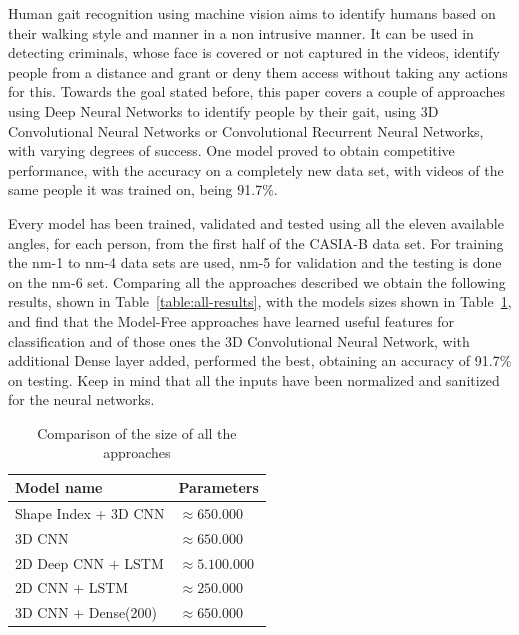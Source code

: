 \documentclass[12pt]{article}
\theoremstyle{definition}
\begin{document}
	Human gait recognition using machine vision aims to identify humans based on their walking style and manner in a non intrusive manner. It can be used in detecting criminals, whose face is covered or not captured in the videos, identify people from a distance and grant or deny them access without taking any actions for this. Towards the goal stated before, this paper covers a couple of approaches using Deep Neural Networks to identify people by their gait, using 3D Convolutional Neural Networks or Convolutional Recurrent Neural Networks, with varying degrees of success. One model proved to obtain competitive performance, with the accuracy on a completely new data set, with videos of the same people it was trained on, being 91.7\%.

	Every model has been trained, validated and tested using all the eleven available angles, for each person, from the first half of the CASIA-B data set. For training the nm-1 to nm-4 data sets are used, nm-5 for validation and the testing is done on the nm-6 set. Comparing all the approaches described we obtain the following results, shown in Table~\ref{table:all-results}, with the models sizes shown in Table~\ref{table:all-size}, and find that the Model-Free approaches have learned useful features for classification and of those ones the 3D Convolutional Neural Network, with additional Dense layer added, performed the best, obtaining an accuracy of 91.7\% on testing. Keep in mind that all the inputs have been normalized and sanitized for the neural networks.

	\begin{table}[h]
		\centering
		\renewcommand{\arraystretch}{1.5}

		\caption{Comparison of the size of all the approaches}
		\label{table:all-size}

		\begin{tabular}{ll}
			\textbf{Model name}  &\textbf{Parameters} \\ \hline
			Shape Index + 3D CNN & $\approx 650.000$   \\ \hline
			3D CNN               & $\approx 650.000$   \\ \hline
			2D Deep CNN + LSTM   & $\approx 5.100.000$ \\ \hline
			2D CNN + LSTM        & $\approx 250.000$   \\ \hline
			3D CNN + Dense(200)  & $\approx 650.000$   \\
		\end{tabular}
	\end{table}
\end{document}
